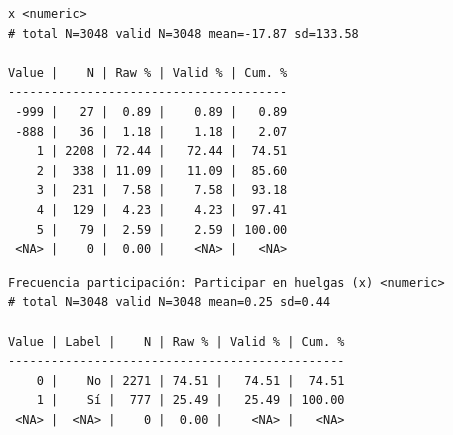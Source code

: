 \documentclass[
  letterpaper,
  DIV=11,
  numbers=noendperiod]{scrreprt}
\newenvironment{Shaded}{\begin{snugshade}}{\end{snugshade}}
\newcommand{\AttributeTok}[1]{\textcolor[rgb]{0.40,0.45,0.13}{#1}}
\newcommand{\CommentTok}[1]{\textcolor[rgb]{0.37,0.37,0.37}{#1}}
\newcommand{\ConstantTok}[1]{\textcolor[rgb]{0.56,0.35,0.01}{#1}}
\newcommand{\DecValTok}[1]{\textcolor[rgb]{0.68,0.00,0.00}{#1}}
\newcommand{\FunctionTok}[1]{\textcolor[rgb]{0.28,0.35,0.67}{#1}}
\newcommand{\NormalTok}[1]{\textcolor[rgb]{0.00,0.23,0.31}{#1}}
\newcommand{\OtherTok}[1]{\textcolor[rgb]{0.00,0.23,0.31}{#1}}
\newcommand{\SpecialCharTok}[1]{\textcolor[rgb]{0.37,0.37,0.37}{#1}}
\newcommand{\StringTok}[1]{\textcolor[rgb]{0.13,0.47,0.30}{#1}}
\begin{document}
\begin{verbatim}
x <numeric> 
# total N=3048 valid N=3048 mean=-17.87 sd=133.58

Value |    N | Raw % | Valid % | Cum. %
---------------------------------------
 -999 |   27 |  0.89 |    0.89 |   0.89
 -888 |   36 |  1.18 |    1.18 |   2.07
    1 | 2208 | 72.44 |   72.44 |  74.51
    2 |  338 | 11.09 |   11.09 |  85.60
    3 |  231 |  7.58 |    7.58 |  93.18
    4 |  129 |  4.23 |    4.23 |  97.41
    5 |   79 |  2.59 |    2.59 | 100.00
 <NA> |    0 |  0.00 |    <NA> |   <NA>
\end{verbatim}

\begin{Shaded}
\end{Shaded}

\begin{verbatim}
Frecuencia participación: Participar en huelgas (x) <numeric> 
# total N=3048 valid N=3048 mean=0.25 sd=0.44

Value | Label |    N | Raw % | Valid % | Cum. %
-----------------------------------------------
    0 |    No | 2271 | 74.51 |   74.51 |  74.51
    1 |    Sí |  777 | 25.49 |   25.49 | 100.00
 <NA> |  <NA> |    0 |  0.00 |    <NA> |   <NA>
\end{verbatim}
\end{document}

